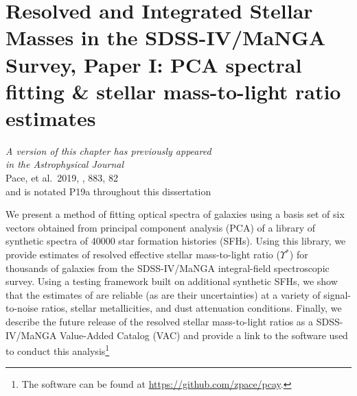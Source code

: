 \chapter[PCA spectral fitting \& stellar mass-to-light ratio estimates]{Resolved and Integrated Stellar Masses in the SDSS-IV/MaNGA Survey, Paper I: PCA spectral fitting \& stellar mass-to-light ratio estimates}
\label{chapter1}

\vfill

\begin{flushright}
    \fixspacing %
    \textit{A version of this chapter has previously appeared\\
        in the \emph{Astrophysical Journal}} \\ \vspace{1ex}
    Pace, et al.\ 2019, \apj, 883, 82 \\ \vspace{1ex}
    and is notated P19a throughout this dissertation
\end{flushright}

\vspace*{1in} %

\cleardoublepage

\begin{chabstract}
We present a method of fitting optical spectra of galaxies using a basis set of six vectors obtained from principal component analysis (PCA) of a library of synthetic spectra of 40000 star formation histories (SFHs). Using this library, we provide estimates of resolved effective stellar mass-to-light ratio ($\Upsilon^*$) for thousands of galaxies from the SDSS-IV/MaNGA integral-field spectroscopic survey. Using a testing framework built on additional synthetic SFHs, we show that the estimates of  are reliable (as are their uncertainties) at a variety of signal-to-noise ratios, stellar metallicities, and dust attenuation conditions. Finally, we describe the future release of the resolved stellar mass-to-light ratios as a SDSS-IV/MaNGA Value-Added Catalog (VAC) and provide a link to the software used to conduct this analysis\footnote{\label{footnote:software_link}The software can be found at \url{https://github.com/zpace/pcay}.}
\end{chabstract}
\cleardoublepage